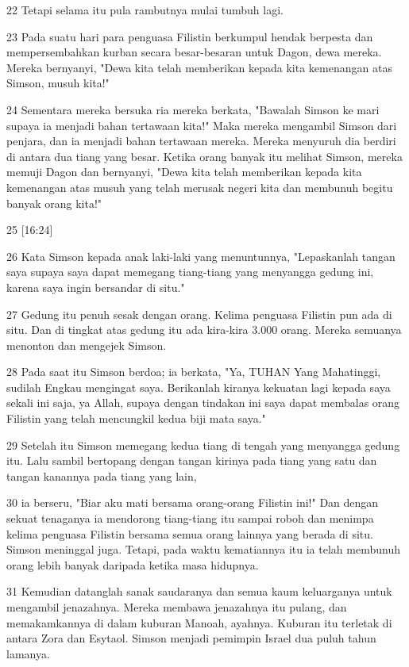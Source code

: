 \par 22 Tetapi selama itu pula rambutnya mulai tumbuh lagi.
\par 23 Pada suatu hari para penguasa Filistin berkumpul hendak berpesta dan mempersembahkan kurban secara besar-besaran untuk Dagon, dewa mereka. Mereka bernyanyi, "Dewa kita telah memberikan kepada kita kemenangan atas Simson, musuh kita!"
\par 24 Sementara mereka bersuka ria mereka berkata, "Bawalah Simson ke mari supaya ia menjadi bahan tertawaan kita!" Maka mereka mengambil Simson dari penjara, dan ia menjadi bahan tertawaan mereka. Mereka menyuruh dia berdiri di antara dua tiang yang besar. Ketika orang banyak itu melihat Simson, mereka memuji Dagon dan bernyanyi, "Dewa kita telah memberikan kepada kita kemenangan atas musuh yang telah merusak negeri kita dan membunuh begitu banyak orang kita!"
\par 25 [16:24]
\par 26 Kata Simson kepada anak laki-laki yang menuntunnya, "Lepaskanlah tangan saya supaya saya dapat memegang tiang-tiang yang menyangga gedung ini, karena saya ingin bersandar di situ."
\par 27 Gedung itu penuh sesak dengan orang. Kelima penguasa Filistin pun ada di situ. Dan di tingkat atas gedung itu ada kira-kira 3.000 orang. Mereka semuanya menonton dan mengejek Simson.
\par 28 Pada saat itu Simson berdoa; ia berkata, "Ya, TUHAN Yang Mahatinggi, sudilah Engkau mengingat saya. Berikanlah kiranya kekuatan lagi kepada saya sekali ini saja, ya Allah, supaya dengan tindakan ini saya dapat membalas orang Filistin yang telah mencungkil kedua biji mata saya."
\par 29 Setelah itu Simson memegang kedua tiang di tengah yang menyangga gedung itu. Lalu sambil bertopang dengan tangan kirinya pada tiang yang satu dan tangan kanannya pada tiang yang lain,
\par 30 ia berseru, "Biar aku mati bersama orang-orang Filistin ini!" Dan dengan sekuat tenaganya ia mendorong tiang-tiang itu sampai roboh dan menimpa kelima penguasa Filistin bersama semua orang lainnya yang berada di situ. Simson meninggal juga. Tetapi, pada waktu kematiannya itu ia telah membunuh orang lebih banyak daripada ketika masa hidupnya.
\par 31 Kemudian datanglah sanak saudaranya dan semua kaum keluarganya untuk mengambil jenazahnya. Mereka membawa jenazahnya itu pulang, dan memakamkannya di dalam kuburan Manoah, ayahnya. Kuburan itu terletak di antara Zora dan Esytaol. Simson menjadi pemimpin Israel dua puluh tahun lamanya.


